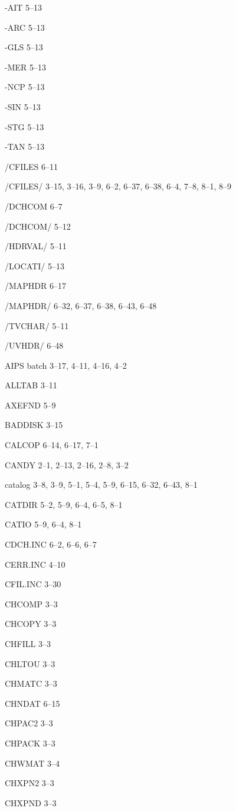 \item -AIT 5--13
\item -ARC 5--13
\item -GLS 5--13
\item -MER 5--13
\item -NCP 5--13
\item -SIN 5--13
\item -STG 5--13
\item -TAN 5--13
\item /CFILES 6--11
\item /CFILES/ 3--15, 3--16, 3--9, 6--2, 6--37, 6--38, 6--4, 7--8, 8--1, 8--9
\item /DCHCOM 6--7
\item /DCHCOM/ 5--12
\item /HDRVAL/ 5--11
\item /LOCATI/ 5--13
\item /MAPHDR 6--17
\item /MAPHDR/ 6--32, 6--37, 6--38, 6--43, 6--48
\item /TVCHAR/ 5--11
\item /UVHDR/ 6--48
\item AIPS batch 3--17, 4--11, 4--16, 4--2
\item ALLTAB 3--11
\item AXEFND 5--9
\item BADDISK 3--15
\item CALCOP 6--14, 6--17, 7--1
\item CANDY 2--1, 2--13, 2--16, 2--8, 3--2
\item catalog 3--8, 3--9, 5--1, 5--4, 5--9, 6--15, 6--32, 6--43, 8--1
\item CATDIR 5--2, 5--9, 6--4, 6--5, 8--1
\item CATIO 5--9, 6--4, 8--1
\item CDCH.INC 6--2, 6--6, 6--7
\item CERR.INC 4--10
\item CFIL.INC 3--30
\item CHCOMP 3--3
\item CHCOPY 3--3
\item CHFILL 3--3
\item CHLTOU 3--3
\item CHMATC 3--3
\item CHNDAT 6--15
\item CHPAC2 3--3
\item CHPACK 3--3
\item CHWMAT 3--4
\item CHXPN2 3--3
\item CHXPND 3--3
